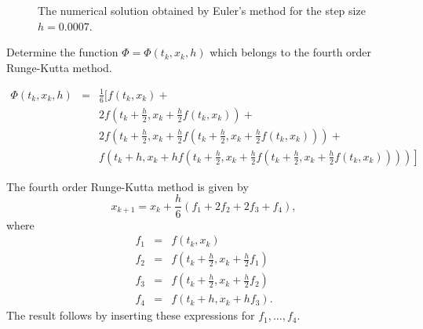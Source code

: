 \documentclass{ximera}
\begin{document}
\begin{figure}[htb]
   \centerline{%
   }
   \caption{The numerical solution obtained by Euler's method for the 
   step size $h=0.0007$.}
   \label{fig:hsmall}
\end{figure}

\EXER

\TEXER

\begin{exercise} \label{c15.3.1}
Determine the function $\Phi=\Phi(t_k,x_k,h)$ which belongs to the 
fourth order Runge-Kutta method.

\begin{solution}
\ans
\begin{eqnarray*}
\Phi(t_k,x_k,h) & = & \frac{1}{6}\Big[f(t_k,x_k)+\\
&&2f\left(t_k+\frac{h}{2},x_k+\frac{h}{2}f(t_k,x_k)\right) +\\
&&2f\left(t_k+\frac{h}{2},x_k+
  \frac{h}{2}f\left(t_k+\frac{h}{2},x_k+\frac{h}{2}f(t_k,x_k)\right)\right)+\\
&&\left.f\left(t_k+h,x_k+hf\left(t_k+\frac{h}{2},x_k+
  \frac{h}{2}f\left(t_k+\frac{h}{2},x_k+
  \frac{h}{2}f(t_k,x_k)\right)\right)\right)\right]
\end{eqnarray*}

\soln The fourth order Runge-Kutta method is given by
\[
x_{k+1} = x_k+\frac{h}{6}(f_1+2f_2+2f_3+f_4),
\]
where
\begin{eqnarray*}
f_1 &=& f(t_k,x_k)\\
f_2 &=& f\left(t_k+\frac{h}{2},x_k+\frac{h}{2}f_1\right)\\
f_3 &=& f\left(t_k+\frac{h}{2},x_k+\frac{h}{2}f_2\right)\\
f_4 &=& f(t_k+h,x_k+hf_3).
\end{eqnarray*}
The result follows by inserting these expressions for $f_1,\ldots,f_4$.

\end{solution}
\end{exercise}
\end{document}
